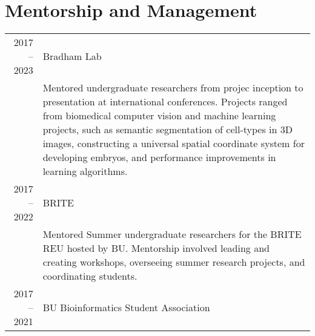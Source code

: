 \documentclass[a4paper,10pt]{report}
\begin{document}
\section{\color{linkcolour} Mentorship and Management}
\begin{longtable}{rp{11cm}}
	2017 -- 2023
	 & Bradham Lab                                                                                                                                                                                                                                                                                                                                                                                     \\
	 & \footnotesize{Mentored undergraduate researchers from  projec inception to presentation at international conferences. Projects ranged from biomedical computer vision and machine learning projects, such as semantic segmentation of cell-types in 3D images, constructing a universal spatial coordinate system for developing embryos, and performance improvements in learning algorithms.} \\
	2017 -- 2022
	 & BRITE                                                                                                                                                                                                                                                                                                                                                                                           \\
	 & \footnotesize{Mentored Summer undergraduate researchers for the
		BRITE REU hosted by BU. Mentorship involved leading and creating workshops, overseeing
	summer research projects, and coordinating students.}                                                                                                                                                                                                                                                                                                                                              \\
	2017 -- 2021
	 & BU Bioinformatics Student Association                                                                                                                                                                                                                                                                                                                                                           \\

\end{longtable}
\end{document}
